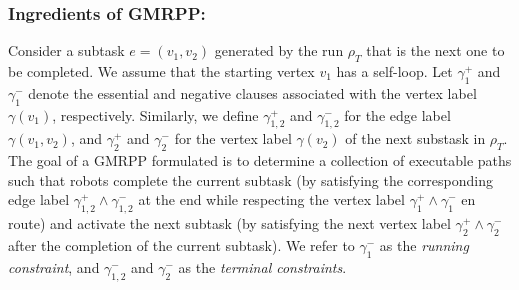 \documentclass[Afour,sageh,times]{sagej}
\begin{document}
{\subsubsection{Ingredients of GMRPP:}\label{sec:gmmpp1} Consider a subtask $e = (v_1, v_2)$ generated by the run $\rho_T$ that is the next one to be completed. We assume that the starting vertex $v_1$ has a self-loop. Let $\gamma_1^+$ and $\gamma_1^-$ denote the essential and negative clauses associated with the vertex label $\gamma(v_1)$, respectively. Similarly, we define  $\gamma_{1,2}^{+}$ and $\gamma_{1,2}^{-}$  for the edge label $\gamma(v_1, v_2)$, and  $\gamma_2^+$ and $\gamma_2^-$ for the vertex label $\gamma(v_2)$ of the next substask in $\rho_T$. The goal of a GMRPP formulated  is to determine a collection of executable paths such that robots complete the current subtask (by satisfying the corresponding edge label $\gamma_{1,2}^+ \wedge \gamma_{1,2}^-$ at the end while respecting the vertex label $\gamma_1^+ \wedge \gamma_1^-$ en route) and activate the next subtask (by satisfying the next vertex label $\gamma_2^{+}\wedge \gamma_2^{-}$ after the completion of the current subtask). We refer to $\gamma_1^-$ as the {\it running constraint}, and $\gamma_{1,2}^- $ and $ \gamma_2^{-}$ as the {\it terminal constraints}.


}
\end{document}
